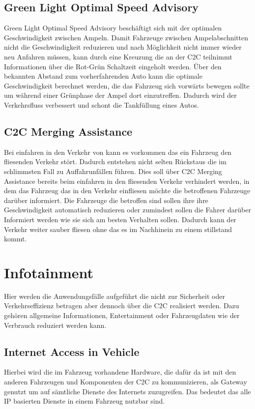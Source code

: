 \subsection{Green Light Optimal Speed Advisory}
Green Light Optimal Speed Advisory beschäftigt sich mit der optimalen Geschwindigkeit zwischen Ampeln. Damit Fahrzeuge zwischen Ampelabschnitten nicht die Geschwindigkeit reduzieren und nach Möglichkeit nicht immer wieder neu Anfahren müssen, kann durch eine Kreuzung die an der \acl{C2C} teilnimmt Informationen über die Rot-Grün Schaltzeit eingeholt werden. Über den bekannten Abstand zum vorherfahrenden Auto kann die optimale Geschwindigkeit berechnet werden, die das Fahrzeug sich vorwärts bewegen sollte um während einer Grünphase der Ampel dort einzutreffen. Dadurch wird der Verkehrsfluss verbessert und schont die Tankfüllung eines Autos.

\subsection{C2C Merging Assistance}
Bei einfahren in den Verkehr von kann es vorkommen das ein Fahrzeug den fliesenden Verkehr stört. Dadurch entstehen nicht selten Rückstaus die im schlimmsten Fall zu Auffahrunfällen führen. Dies soll über C2C Merging Assistance bereits beim einfahren in den fliesenden Verkehr verhindert werden, in dem das Fahrzeug das in den Verkehr einfliesen möchte die betroffenen Fahrzeuge darüber informiert. Die Fahrzeuge die betroffen sind sollen ihre ihre Geschwindigkeit automatisch reduzieren oder zumindest sollen die Fahrer darüber Informiert werden wie sie sich am besten Verhalten sollen. Dadurch kann der Verkehr weiter sauber fliesen ohne das es im Nachhinein zu einem stillstand kommt. 

\section{Infotainment}
Hier werden die Anwendungsfälle aufgeführt die nicht zur Sicherheit oder Verkehrseffizienz betragen aber dennoch über die \acl{C2C} realisiert werden. Dazu gehören allgemeine Informationen, Entertainment oder Fahrzeugdaten wie der Verbrauch reduziert werden kann. 

\subsection{Internet Access in Vehicle}
Hierbei wird die im Fahrzeug vorhandene Hardware, die dafür da ist mit den anderen Fahrzeugen und Komponenten der \acl{C2C} zu kommunizieren, als Gateway genutzt um auf sämtliche Dienste des Internets zuzugreifen. Das bedeutet das alle IP basierten Dienste in einem Fahrzeug nutzbar sind.  

